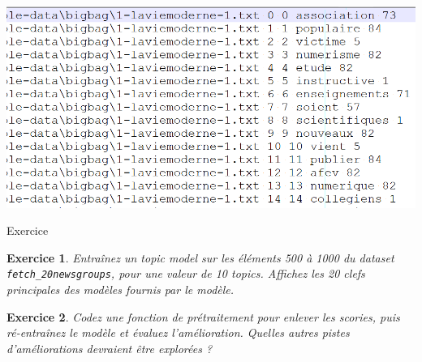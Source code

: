\documentclass[11pt]{beamer}
\newtheorem{exercice}{Exercice}
\begin{document}
\begin{frame}
\vspace{1.5cm}

\includegraphics[scale=0.25]{code4-mots.png}

\end{frame}


\begin{frame}{Exercice}

\begin{exercice}
Entraînez un topic model sur les éléments 500 à 1000 du dataset \texttt{fetch\_20newsgroups}, pour une valeur de 10 topics. Affichez les 20 clefs principales des modèles fournis par le modèle.
\end{exercice}

\begin{exercice}
Codez une fonction de prétraitement pour enlever les scories, puis ré-entraînez le modèle et évaluez l'amélioration. Quelles autres pistes d'améliorations devraient être explorées ?
\end{exercice}

\end{frame}
\end{document}
